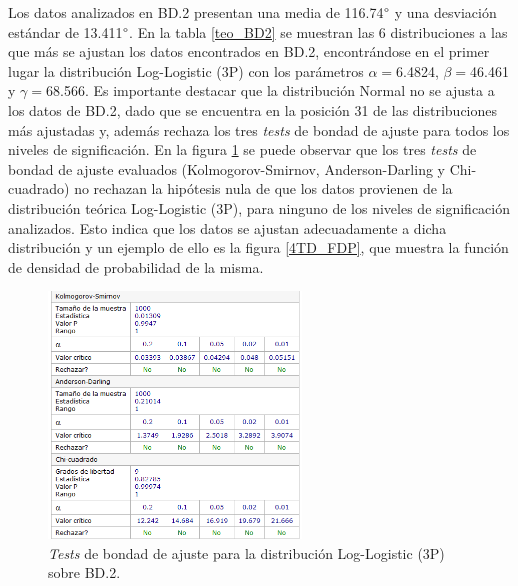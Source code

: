 \documentclass[12pt]{report}
\begin{document}
Los datos analizados en BD.2 presentan una media de 116.74$\degree$ y una desviación estándar de 13.411$\degree$.
En la tabla \ref{teo_BD2}  se muestran las 6 distribuciones a las que más se ajustan los datos encontrados en BD.2, encontrándose en el primer lugar la distribución Log-Logistic (3P) con los parámetros $\alpha=$6.4824, $\beta=$46.461 y $\gamma=$68.566. Es importante destacar que la distribución Normal no se ajusta a los datos de BD.2, dado que se encuentra en la posición 31 de las distribuciones más ajustadas y, además rechaza los tres \textit{tests} de bondad de ajuste para todos los niveles de significación. En la figura \ref{4TD_BONDAD} se puede observar que los tres \textit{tests} de bondad de ajuste evaluados (Kolmogorov-Smirnov, Anderson-Darling y Chi-cuadrado) no rechazan la hipótesis nula de que los datos provienen de la distribución teórica Log-Logistic (3P), para ninguno de los niveles de significación analizados. Esto indica que los datos se ajustan adecuadamente a dicha distribución y un ejemplo de ello es la figura \ref{4TD_FDP}, que muestra la función de densidad de probabilidad de la misma. 
\begin{figure}[ht]
	\centering
	
	\includegraphics[width=0.6\textwidth]{4td_bondad.png}
	\caption{\textit{Tests} de bondad de ajuste para la distribución Log-Logistic (3P) sobre BD.2.}
	\label{4TD_BONDAD}
\end{figure}




\end{document}
